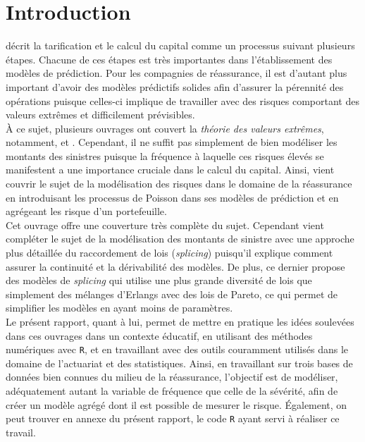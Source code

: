 \section{Introduction}
	\cite{Parodi2015_Pricing_in_GenIns} décrit la tarification et le calcul du capital comme un processus suivant plusieurs étapes. Chacune de ces étapes est très importantes dans l'établissement des modèles de prédiction. Pour les compagnies de réassurance, il est d'autant plus important d'avoir des modèles prédictifs solides afin d'assurer la pérennité des opérations puisque celles-ci implique de travailler avec des risques comportant des valeurs extrêmes et difficilement prévisibles.\\
	
	À ce sujet, plusieurs ouvrages ont couvert la \textit{théorie des valeurs extrêmes}, notamment, \cite{norwegianfireEtSecura} et \cite{Danish}. Cependant, il ne suffit pas simplement de bien modéliser les montants des sinistres puisque la fréquence à laquelle ces risques élevés se manifestent a une importance cruciale dans le calcul du capital. Ainsi, \cite{albrecher2017reinsurance} vient couvrir le sujet de la modélisation des risques dans le domaine de la réassurance en introduisant les processus de Poisson dans ses modèles de prédiction et en agrégeant les risque d'un portefeuille. \\
	
	Cet ouvrage offre une couverture très complète du sujet. Cependant \cite{brazauskas2016modeling} vient compléter le sujet de la modélisation des montants de sinistre avec une approche plus détaillée du raccordement de lois (\textit{splicing}) puisqu'il explique comment assurer la continuité et la dérivabilité des modèles. De plus, ce dernier propose des modèles de \textit{splicing} qui utilise une plus grande diversité de lois que simplement des mélanges d'Erlangs avec des lois de Pareto, ce qui permet de simplifier les modèles en ayant moins de paramètres.\\
	
	Le présent rapport, quant à lui, permet de mettre en pratique les idées soulevées dans ces ouvrages dans un contexte éducatif, en utilisant des méthodes numériques avec \texttt{R}, et en travaillant avec des outils couramment utilisés dans le domaine de l'actuariat et des statistiques. Ainsi, en travaillant sur trois bases de données bien connues du milieu de la réassurance, l'objectif est de modéliser, adéquatement autant la variable de fréquence que celle de la sévérité, afin de créer un modèle agrégé dont il est possible de mesurer le risque. Également, on peut trouver en annexe du présent rapport, le code \texttt{R} ayant servi à réaliser ce travail.\\
	
